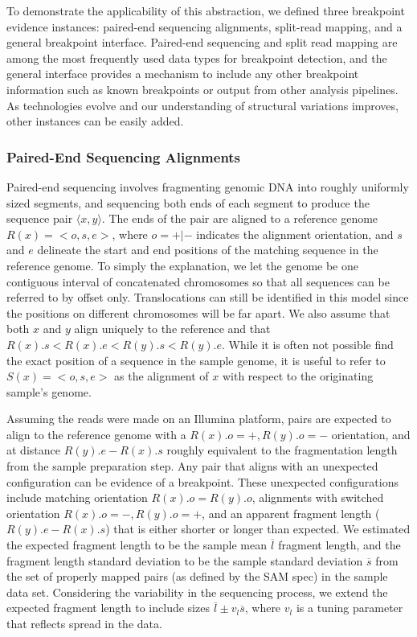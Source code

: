 \documentclass[10pt]{bmc_article}
\newenvironment{bmcformat}{\begin{raggedright}\baselineskip20pt\sloppy\setboolean{publ}{false}}{\end{raggedright}\baselineskip20pt\sloppy}
\begin{document}
\begin{bmcformat}
To demonstrate the applicability of this abstraction, we defined three
breakpoint evidence instances: paired-end sequencing alignments, split-read
mapping, and a general breakpoint interface.  Paired-end sequencing and split
read mapping are among the most frequently used data types for breakpoint
detection, and the general interface provides a mechanism to include any other
breakpoint information such as known breakpoints or output from other analysis
pipelines.  As technologies evolve and our understanding of structural
variations improves, other instances can be easily added.

\subsubsection*{Paired-End Sequencing Alignments}

Paired-end sequencing involves fragmenting genomic DNA into roughly uniformly
sized segments, and sequencing both ends of each segment to produce the sequence
pair $\langle x,y \rangle$.  The ends of the pair are
aligned to a reference genome $R(x)=<o,s,e>$, where $o=+|-$ indicates the
alignment orientation, and $s$ and $e$ delineate the start and end positions of
the matching sequence in the reference genome.  To simply the explanation, we
let the genome be one contiguous interval of concatenated chromosomes so that
all sequences can be referred to by offset only.  Translocations can still be
identified in this model since the positions on different chromosomes will be
far apart.  We also assume that both $x$ and $y$ align uniquely to the
reference and that $R(x).s<R(x).e<R(y).s<R(y).e$.  While it is often not
possible find the exact position of a sequence in the sample genome, it is
useful to refer to $S(x)=<o,s,e>$ as the alignment of $x$ with respect to the
originating sample's genome.

Assuming the reads were made on an Illumina platform, pairs are expected to
align to the reference genome with a $R(x).o=+, R(y).o=-$ orientation, and at
distance $R(y).e - R(x).s$ roughly equivalent to the fragmentation length from
the sample preparation step.  Any pair that aligns with an unexpected
configuration can be evidence of a breakpoint.  These unexpected configurations
include matching orientation $R(x).o = R(y).o$, alignments with switched
orientation $R(x).o=-, R(y).o=+$, and an apparent fragment length ($R(y).e -
R(x).s$) that is either shorter or longer than expected.  We estimated the
expected fragment length to be the sample mean $\overline{l}$ fragment length,
and the fragment length standard deviation to be the sample standard deviation
$\overline{s}$ from the set of properly mapped pairs (as defined by the SAM
spec) in the sample data set.  Considering the variability in the sequencing
process, we extend the expected fragment length to include sizes
$\overline{l}\pm v_l \overline{s}$, where $v_l$ is a tuning parameter that
reflects spread in the data.


\end{bmcformat}
\end{document}
